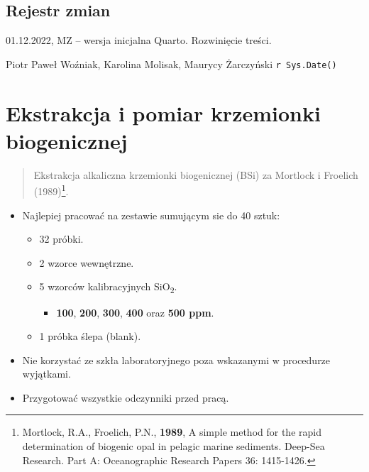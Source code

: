 \documentclass[
  letterpaper,
  DIV=11,
  numbers=noendperiod]{scrreprt}
\providecommand{\tightlist}{%
  \setlength{\itemsep}{0pt}\setlength{\parskip}{0pt}}\usepackage{longtable,booktabs,array}
\begin{document}
\hypertarget{pagebreak-rejestr-zmian-1}{%
\section{\texorpdfstring{\newpage{}Rejestr
zmian}{Rejestr zmian}}\label{pagebreak-rejestr-zmian-1}}

01.12.2022, MZ -- wersja inicjalna Quarto. Rozwinięcie treści.

Piotr Paweł Woźniak, Karolina Molisak, Maurycy Żarczyński
\texttt{r\ Sys.Date()}

\hypertarget{ekstrakcja-i-pomiar-krzemionki-biogenicznej}{%
\chapter{Ekstrakcja i pomiar krzemionki
biogenicznej}\label{ekstrakcja-i-pomiar-krzemionki-biogenicznej}}

\begin{quote}
Ekstrakcja alkaliczna krzemionki biogenicznej (BSi) za Mortlock i
Froelich (1989)\footnote{Mortlock, R.A., Froelich, P.N., \textbf{1989},
  A simple method for the rapid determination of biogenic opal in
  pelagic marine sediments. Deep-Sea Research. Part A: Oceanographic
  Research Papers 36: 1415-1426.}.
\end{quote}

\begin{itemize}
\tightlist
\item
  Najlepiej pracować na zestawie sumującym sie do 40 sztuk:

  \begin{itemize}
  \item
    32 próbki.
  \item
    2 wzorce wewnętrzne.
  \item
    5 wzorców kalibracyjnych SiO\textsubscript{2}.

    \begin{itemize}
    \tightlist
    \item
      \textbf{100}, \textbf{200}, \textbf{300}, \textbf{400} oraz
      \textbf{500 ppm}.
    \end{itemize}
  \item
    1 próbka ślepa (blank).
  \end{itemize}
\item
  Nie korzystać ze szkła laboratoryjnego poza wskazanymi w procedurze
  wyjątkami.
\item
  Przygotować wszystkie odczynniki przed pracą.
\end{itemize}
\end{document}
